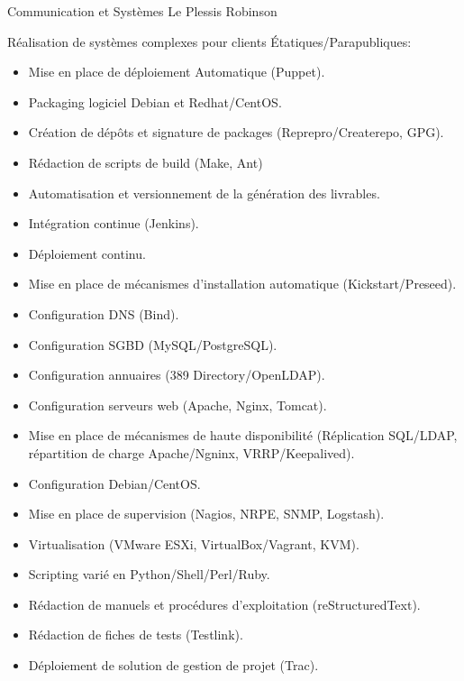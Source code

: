 \documentclass[10pt,a4paper,sans]{moderncv}        %
\begin{document}
              {Communication et Systèmes}
              {Le Plessis Robinson}
              {}
              {Réalisation de systèmes complexes pour clients Étatiques/Parapubliques:
                \begin{itemize}
                \item Mise en place de déploiement Automatique (Puppet).
                \item Packaging logiciel Debian et Redhat/CentOS.
                \item Création de dépôts et signature de packages (Reprepro/Createrepo, GPG).
                \item Rédaction de scripts de build (Make, Ant)
                \item Automatisation et versionnement de la génération des livrables.
                \item Intégration continue (Jenkins).
                \item Déploiement continu.
                \item Mise en place de mécanismes d'installation automatique (Kickstart/Preseed).
                \item Configuration DNS (Bind).
                \item Configuration SGBD (MySQL/PostgreSQL).
                \item Configuration annuaires (389 Directory/OpenLDAP).
                \item Configuration serveurs web (Apache, Nginx, Tomcat).
                \item Mise en place de mécanismes de haute disponibilité (Réplication SQL/LDAP, répartition de charge Apache/Ngninx, VRRP/Keepalived).
                \item Configuration Debian/CentOS.
                \item Mise en place de supervision (Nagios, NRPE, SNMP, Logstash).
                \item Virtualisation (VMware ESXi, VirtualBox/Vagrant, KVM).
                \item Scripting varié en Python/Shell/Perl/Ruby.
                \item Rédaction de manuels et procédures d'exploitation (reStructuredText).
                \item Rédaction de fiches de tests (Testlink).
                \item Déploiement de solution de gestion de projet (Trac).
                \end{itemize}
              }
\end{document}
